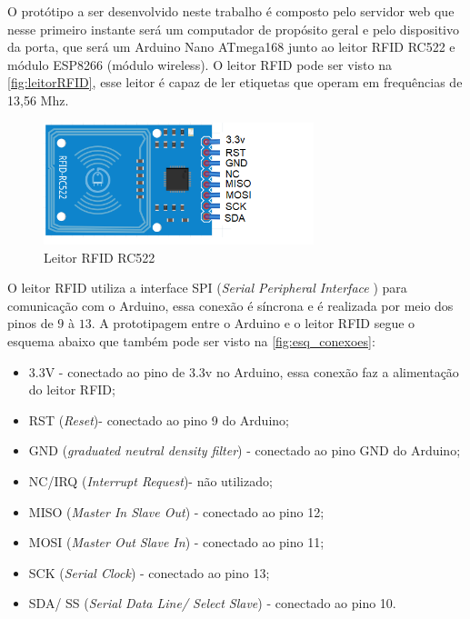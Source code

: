 O protótipo a ser desenvolvido neste trabalho é composto pelo servidor web que nesse primeiro instante será um computador de 
propósito geral e pelo dispositivo da porta, que será um Arduino Nano ATmega168 junto ao leitor RFID RC522 e módulo ESP8266 (módulo wireless). 
O leitor RFID pode ser visto na \autoref{fig:leitorRFID}, esse leitor é capaz de ler etiquetas que operam em 
frequências de 13,56 Mhz.
\begin{figure}[H]
              \caption{\label{fig:leitorRFID}{Leitor RFID RC522}}
              \centering
              \includegraphics[width=0.7\textwidth]{Figuras/rfid_rc522.PNG}
\end{figure}

\par
O leitor RFID utiliza a interface SPI (\textit{Serial Peripheral Interface} ) para comunicação com o Arduino, 
essa conexão é síncrona e é realizada por meio dos pinos de $9$ à $13$. A prototipagem entre o Arduino e o leitor RFID 
segue o esquema abaixo que também pode ser visto na \autoref{fig:esq_conexoes}:
\begin{itemize}
    \item 3.3V - conectado ao pino de 3.3v no Arduino, essa conexão faz a alimentação do leitor RFID;
    \item RST (\textit{Reset})- conectado ao pino 9 do Arduino;
    \item GND (\textit{graduated neutral density filter}) - conectado ao pino GND do Arduino;
    \item NC/IRQ (\textit{Interrupt Request})- não utilizado;
    \item MISO (\textit{Master In Slave Out}) - conectado ao pino 12;
    \item MOSI  (\textit{Master Out Slave In}) - conectado ao pino 11; 
    \item SCK  (\textit{Serial Clock}) - conectado ao pino 13;
    \item SDA/ SS (\textit{Serial Data Line/ Select Slave}) - conectado ao pino 10.
\end{itemize}

